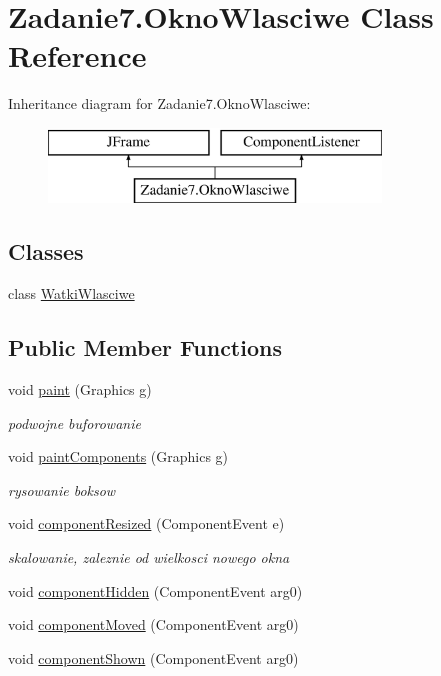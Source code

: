\hypertarget{class_zadanie7_1_1_okno_wlasciwe}{}\section{Zadanie7.\+Okno\+Wlasciwe Class Reference}
\label{class_zadanie7_1_1_okno_wlasciwe}
Inheritance diagram for Zadanie7.\+Okno\+Wlasciwe\+:\begin{figure}[H]
\begin{center}
\leavevmode
\includegraphics[height=2.000000cm]{class_zadanie7_1_1_okno_wlasciwe}
\end{center}
\end{figure}
\subsection*{Classes}
\begin{DoxyCompactItemize}
\item 
class \hyperlink{class_zadanie7_1_1_okno_wlasciwe_1_1_watki_wlasciwe}{Watki\+Wlasciwe}
\end{DoxyCompactItemize}
\subsection*{Public Member Functions}
\begin{DoxyCompactItemize}
\item 
void \hyperlink{class_zadanie7_1_1_okno_wlasciwe_ad6be5bc65e9c28156611abe622b27fd6}{paint} (Graphics g)
\begin{DoxyCompactList}\small\item\em podwojne buforowanie \end{DoxyCompactList}\item 
void \hyperlink{class_zadanie7_1_1_okno_wlasciwe_a2cfd87352800ef1a9aa7746033a5436b}{paint\+Components} (Graphics g)
\begin{DoxyCompactList}\small\item\em rysowanie boksow \end{DoxyCompactList}\item 
void \hyperlink{class_zadanie7_1_1_okno_wlasciwe_a48ca8c4ab5ec7949801e31a2359a689f}{component\+Resized} (Component\+Event e)
\begin{DoxyCompactList}\small\item\em skalowanie, zaleznie od wielkosci nowego okna \end{DoxyCompactList}\item 
void \hyperlink{class_zadanie7_1_1_okno_wlasciwe_a5691cd056cd2bf85af4f53e29fed7b43}{component\+Hidden} (Component\+Event arg0)
\item 
void \hyperlink{class_zadanie7_1_1_okno_wlasciwe_a64d00ee7a3be96cfabb548ee54fe7915}{component\+Moved} (Component\+Event arg0)
\item 
void \hyperlink{class_zadanie7_1_1_okno_wlasciwe_ab2ee70e1ec0517025b4530f963321dd4}{component\+Shown} (Component\+Event arg0)
\end{DoxyCompactItemize}
